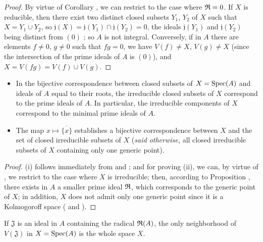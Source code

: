 \begin{proof}
\label{proof-1.1.1.13}
By virtue of Corollary , we can restrict to the case where
$\mathfrak{R}=0$. If $X$ is reducible, then there exist two distinct closed subsets $Y_1$, $Y_2$
of $X$ such that $X=Y_1\cup Y_2$, so $\mathfrak{j}(X)=\mathfrak{j}(Y_1)\cap\mathfrak{j}(Y_2)=0$,
the ideals $\mathfrak{j}(Y_1)$ and $\mathfrak{j}(Y_2)$ being distinct from $(0)$
; so $A$ is not integral. Conversely, if in $A$ there are
elements $f\neq 0$, $g\neq 0$ such that $fg=0$, we have $V(f)\neq X$, $V(g)\neq X$ (since the
intersection of the prime ideals of $A$ is $(0)$), and $X=V(fg)=V(f)\cup V(g)$.
\end{proof}

\begin{cor}[1.1.14]
\label{1.1.1.14}
\medskip\noindent
\begin{itemize}
  \item[{\rm(i)}] In the bijective correspondence between closed subsets of $X={\mathop{\mathrm{Spec}}\nolimits}(A)$
    and ideals of $A$ equal to their roots, the irreducible closed subsets
    of $X$ correspond to the prime ideals of $A$. In particular, the irreducible
    components of $X$ correspond to the minimal prime ideals of $A$.
  \item[{\rm(ii)}] The map $x\mapsto\overline{\{x\}}$ establishes a bijective correspondence
    between $X$ and the set of closed irreducible subsets of $X$ ({\em said otherwise,} all
    closed irreducible subsets of $X$ containing only one generic point).
\end{itemize}
\end{cor}

\begin{proof}
\label{proof-1.1.1.14}
(i) follows immediately from  and
; and for
proving (ii), we can, by virtue of , we restrict to the
case where $X$ is irreducible; then, according to
Proposition , there exists
in $A$ a smaller prime ideal $\mathfrak{R}$, which corresponds to the generic point
of $X$; in addition, $X$ does not admit only one generic point since it is a Kolmogoroff
space ( and ).
\end{proof}

\begin{prop}[1.1.15]
\label{1.1.1.15}
If $\mathfrak{J}$ is an ideal in $A$ containing the radical $\mathfrak{R}(A)$, the only
neighborhood of $V(\mathfrak{J})$ in $X={\mathop{\mathrm{Spec}}\nolimits}(A)$ is the whole space $X$.
\end{prop}

